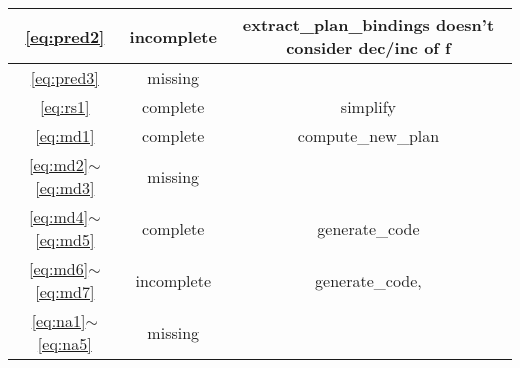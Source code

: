 \documentclass{article}
\begin{document}
\begin{tabular} {|c|c|c|}
\hline \ref{eq:pred2} & incomplete & extract\_plan\_bindings doesn't consider dec/inc of f\\
\hline \ref{eq:pred3} & missing & \\
\hline \ref{eq:rs1} & complete & simplify \\
\hline \ref{eq:md1} & complete & compute\_new\_plan\\
\hline \ref{eq:md2}$\sim$\ref{eq:md3} & missing & \\
\hline \ref{eq:md4}$\sim$\ref{eq:md5} & complete & generate\_code\\
\hline \ref{eq:md6}$\sim$\ref{eq:md7} & incomplete & generate\_code, \\
\hline \ref{eq:na1}$\sim$\ref{eq:na5} & missing & \\
\hline

\end{tabular}
\pagebreak
\end{document}
